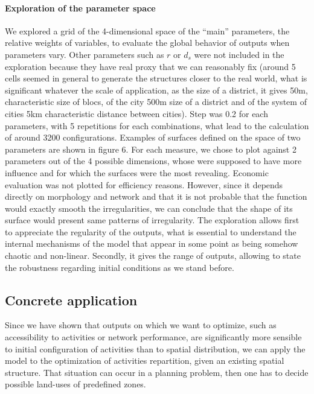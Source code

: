 \documentclass[a4paper,twocolumn,twoside,10pt]{article}
\begin{document}
\paragraph{Exploration of the parameter space}

We explored a grid of the 4-dimensional space of the ``main'' parameters,
the relative weights of variables, to evaluate the global behavior
of outputs when parameters vary. Other parameters such as $r$ or
$d_{s}$ were not included in the exploration because they have real
proxy that we can reasonably fix (around 5 cells seemed in general
to generate the structures closer to the real world, what is significant
whatever the scale of application, as the size of a district, it gives
50m, characteristic size of blocs, of the city 500m size of a district
and of the system of cities 5km characteristic distance between cities).
Step was 0.2 for each parameters, with 5 repetitions for each combinations,
what lead to the calculation of around 3200 configurations. Examples
of surfaces defined on the space of two parameters are shown in figure
6. For each measure, we chose to plot against 2 parameters out of
the 4 possible dimensions, whose were supposed to have more influence
and for which the surfaces were the most revealing. Economic evaluation
was not plotted for efficiency reasons. However, since it depends
directly on morphology and network and that it is not probable that
the function would exactly smooth the irregularities, we can conclude
that the shape of its surface would present same patterns of irregularity.
The exploration allows first to appreciate the regularity of the outputs,
what is essential to understand the internal mechanisms of the model
that appear in some point as being somehow chaotic and non-linear.
Secondly, it gives the range of outputs, allowing to state the robustness
regarding initial conditions as we stand before.


\subsection{Concrete application}

Since we have shown that outputs on which we want to optimize, such
as accessibility to activities or network performance, are significantly
more sensible to initial configuration of activities than to spatial
distribution, we can apply the model to the optimization of activities
repartition, given an existing spatial structure. That situation can
occur in a planning problem, then one has to decide possible land-uses
of predefined zones.
\end{document}
